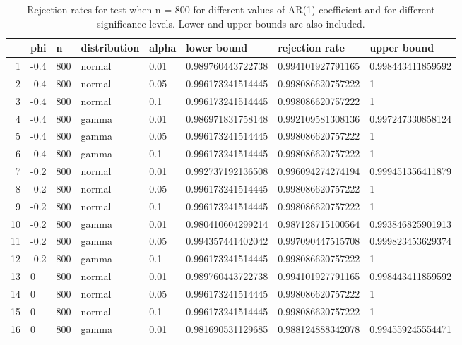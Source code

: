 \begin{table}[ht]
\centering
\caption{Rejection rates for test when n = 800 for 
                   different values of AR(1) coefficient and for different 
                   significance levels. Lower and upper bounds are also 
                   included.} 
\label{table:rr_800}
\begin{tabular}{rlllllll}
  \hline
 & phi & n & distribution & alpha & lower bound & rejection rate & upper bound \\ 
  \hline
1 & -0.4 & 800 & normal & 0.01 & 0.989760443722738 & 0.994101927791165 & 0.998443411859592 \\ 
  2 & -0.4 & 800 & normal & 0.05 & 0.996173241514445 & 0.998086620757222 & 1 \\ 
  3 & -0.4 & 800 & normal & 0.1 & 0.996173241514445 & 0.998086620757222 & 1 \\ 
  4 & -0.4 & 800 & gamma & 0.01 & 0.986971831758148 & 0.992109581308136 & 0.997247330858124 \\ 
  5 & -0.4 & 800 & gamma & 0.05 & 0.996173241514445 & 0.998086620757222 & 1 \\ 
  6 & -0.4 & 800 & gamma & 0.1 & 0.996173241514445 & 0.998086620757222 & 1 \\ 
  7 & -0.2 & 800 & normal & 0.01 & 0.992737192136508 & 0.996094274274194 & 0.999451356411879 \\ 
  8 & -0.2 & 800 & normal & 0.05 & 0.996173241514445 & 0.998086620757222 & 1 \\ 
  9 & -0.2 & 800 & normal & 0.1 & 0.996173241514445 & 0.998086620757222 & 1 \\ 
  10 & -0.2 & 800 & gamma & 0.01 & 0.980410604299214 & 0.987128715100564 & 0.993846825901913 \\ 
  11 & -0.2 & 800 & gamma & 0.05 & 0.994357441402042 & 0.997090447515708 & 0.999823453629374 \\ 
  12 & -0.2 & 800 & gamma & 0.1 & 0.996173241514445 & 0.998086620757222 & 1 \\ 
  13 & 0 & 800 & normal & 0.01 & 0.989760443722738 & 0.994101927791165 & 0.998443411859592 \\ 
  14 & 0 & 800 & normal & 0.05 & 0.996173241514445 & 0.998086620757222 & 1 \\ 
  15 & 0 & 800 & normal & 0.1 & 0.996173241514445 & 0.998086620757222 & 1 \\ 
  16 & 0 & 800 & gamma & 0.01 & 0.981690531129685 & 0.988124888342078 & 0.994559245554471 \\ 

\end{tabular}
\end{table}
